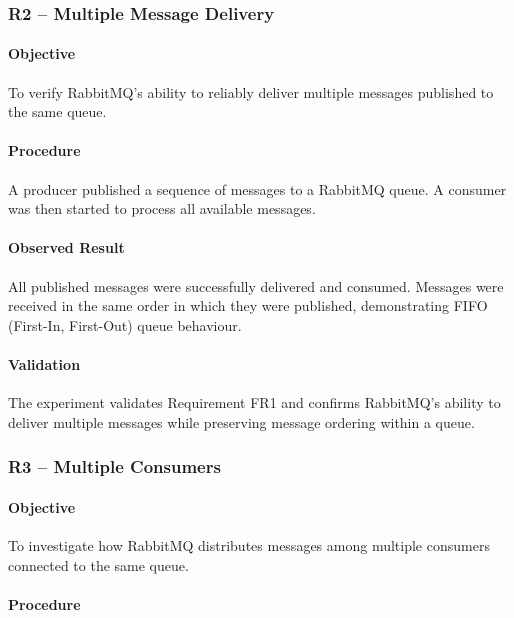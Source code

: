 \documentclass{scrartcl}
\begin{document}
\subsubsection{R2 -- Multiple Message Delivery}

\paragraph{Objective}

To verify RabbitMQ's ability to reliably deliver multiple messages published to the same queue.

\paragraph{Procedure}

A producer published a sequence of messages to a RabbitMQ queue. A consumer was then started to process all available messages.

\paragraph{Observed Result}

All published messages were successfully delivered and consumed. Messages were received in the same order in which they were published, demonstrating FIFO (First-In, First-Out) queue behaviour.

\paragraph{Validation}

The experiment validates Requirement FR1 and confirms RabbitMQ's ability to deliver multiple messages while preserving message ordering within a queue.

\subsubsection{R3 -- Multiple Consumers}

\paragraph{Objective}

To investigate how RabbitMQ distributes messages among multiple consumers connected to the same queue.

\paragraph{Procedure}
\end{document}
